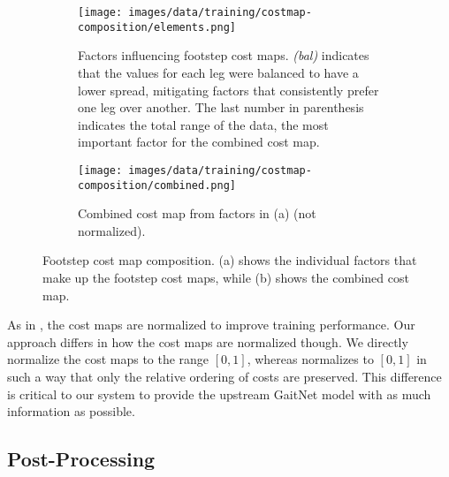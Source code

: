 \begin{figure}[H]
  \centering
  \begin{subfigure}[T]{0.65\textwidth}
    \centering
    \texttt{[image: images/data/training/costmap-composition/elements.png]}
    \caption{Factors influencing footstep cost maps. \textit{(bal)}
      indicates that the values for each leg were balanced to have a
      lower spread, mitigating factors that consistently prefer one leg
      over another. The last number in parenthesis indicates the total
    range of the data, the most important factor for the combined cost map.}
    \label{fig:data-costmap-composition-elements}
  \end{subfigure}
  \hfill
  \begin{subfigure}[T]{0.3\textwidth}
    \centering
    \texttt{[image: images/data/training/costmap-composition/combined.png]}
    \caption{Combined cost map from factors in (a) (not normalized).}
    \label{fig:data-costmap-composition-combined}
  \end{subfigure}
  \hfill
  \caption{Footstep cost map composition. (a) shows the individual
    factors that make up the footstep cost maps, while (b) shows the
  combined cost map.}
  \label{fig:data-costmap-composition}
\end{figure}

As in \cite{bratta_contactnet_2024}, the cost maps are normalized to
improve training performance. Our approach differs in how the cost
maps are normalized though. We directly normalize the cost maps to
the range $[0, 1]$, whereas \cite{bratta_contactnet_2024} normalizes
to $[0,1]$ in such a way that only the relative ordering of costs are
preserved. This difference is critical to our system to provide the
upstream GaitNet model with as much information as possible.

\subsection{Post-Processing}

